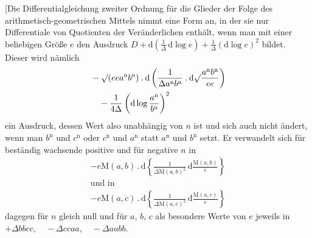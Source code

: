 \begingroup
\renewcommand{\arraystretch}{1.45}
[Die Differentialgleichung zweiter Ordnung für die Glieder der Folge des arithmetisch-geometrischen Mittels nimmt eine Form an, in der sie nur Differentiale von Quotienten der Veränderlichen enthält, wenn man mit einer beliebigen Größe $e$ den Ausdruck
$D+\mathrm d(\frac{1}{\Delta}\,\allowbreak \mathrm d\log e)+\frac{1}{\Delta}(\mathrm d\log e)^2$
bildet. Dieser wird nämlich
\[
\begin{aligned}&-\surd(eea^{\mathrm n}b^{\mathrm n})\mathbin{.}\mathrm d
\left(\frac{1}{\Delta a^{\mathrm n}b^{\mathrm n}}\mathbin{.}\mathrm d
\surd\frac{a^{\mathrm n}b^{\mathrm n}}{ee}\right)\\&\quad-\frac{1}{4\Delta}\left(\mathrm d\log\frac{a^{\mathrm n}}{b^{\mathrm n}}\right)^2\end{aligned}
\]
ein Ausdruck, dessen Wert also unabhängig von $n$ ist und sich auch nicht ändert, wenn man $b^{\mathrm n}$ und $c^{\mathrm n}$ oder $c^{\mathrm n}$ und
$a^{\mathrm n}$ statt $a^{\mathrm n}$ und $b^{\mathrm n}$ setzt. Er verwandelt sich für beständig wachsende positive und für negative $n$ in
\[
\begin{gathered}-e\mathrm M(a,b)\mathbin{.}\mathrm d
\left\{\frac{1}{\Delta\mathrm M(a,b)^2}\,\mathrm d\frac{\mathrm M(a,b)}{e}\right\}
\\[7pt]\mbox{und in}\\[7pt]
-e\mathrm M(a,c)\mathbin{.}\mathrm d
\left\{\frac{1}{\Delta\mathrm M(a,c)^2}\,\mathrm d\frac{\mathrm M(a,c)}{e}\right\}\end{gathered}
\]
dagegen für $n$ gleich null und für $a$, $b$, $c$ als besondere Werte von $e$ jeweils in $+\Delta bbcc,\quad-\Delta ccaa,\quad-\Delta aabb.$

